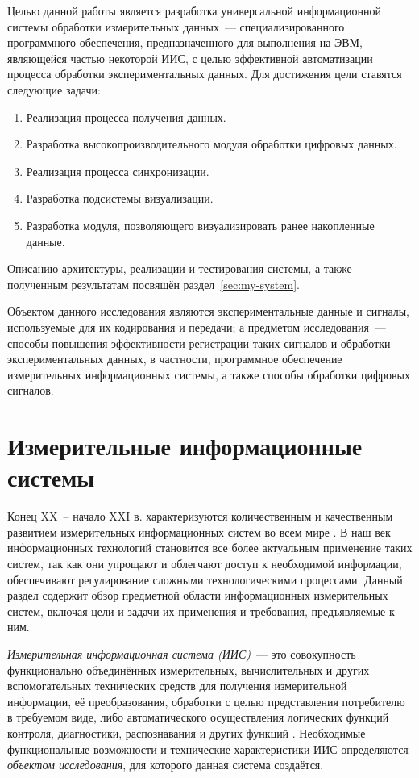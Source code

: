 \documentclass[a4paper, 14pt, titlepage]{extarticle}
\newcommand{\term}[1]{\emph{#1}}
\let\oldsection\section
\renewcommand{\section}{\newpage\oldsection}
\begin{document}
  Целью данной работы является разработка универсальной информационной системы обработки
  измерительных данных~--- специализированного программного обеспечения, предназначенного для
  выполнения на ЭВМ, являющейся частью некоторой ИИС, с целью эффективной автоматизации процесса
  обработки экспериментальных данных. Для достижения цели ставятся следующие задачи:
  \begin{enumerate}
    \item Реализация процесса получения данных.
    \item Разработка высокопроизводительного модуля обработки цифровых данных.
    \item Реализация процесса синхронизации.
    \item Разработка подсистемы визуализации.
    \item Разработка модуля, позволяющего визуализировать ранее накопленные данные.
  \end{enumerate}
  Описанию архитектуры, реализации и тестирования системы, а также полученным результатам посвящён раздел~\ref{sec:my-system}.

  Объектом данного исследования являются экспериментальные данные и сигналы, используемые для их
  кодирования и передачи; а предметом исследования~--- способы повышения эффективности регистрации
  таких сигналов и обработки экспериментальных данных, в частности, программное обеспечение
  измерительных информационных системы, а также способы обработки цифровых сигналов.


  \section{Измерительные информационные системы}\label{sec:iis}

  Конец XX~-- начало XXI в. характеризуются количественным и качественным развитием измерительных
  информационных систем во всем мире \cite[с.~3]{rannev-iis}. В наш век информационных
  технологий становится все более актуальным применение таких систем, так как они упрощают и облегчают доступ
  к необходимой информации, обеспечивают регулирование сложными технологическими процессами.
  Данный раздел содержит обзор предметной области информационных измерительных систем, включая цели
  и задачи их применения и требования, предъявляемые к ним.

  \term{Измерительная информационная система (ИИС)}~--- это совокупность функционально объединённых
  измерительных, вычислительных и других вспомогательных технических средств для получения
  измерительной информации, её преобразования, обработки с целью представления потребителю в
  требуемом виде, либо автоматического осуществления логических функций контроля, диагностики,
  распознавания и других функций \cite[с.~9]{volkov-iis}.
  Необходимые функциональные возможности и технические характеристики ИИС определяются
  \term{объектом исследования}, для которого данная система создаётся.
\end{document}
